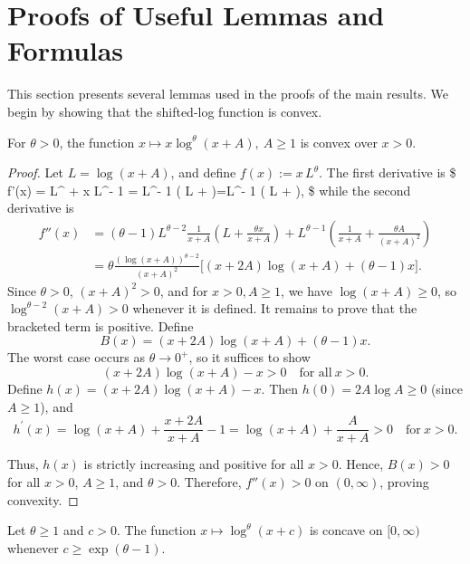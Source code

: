 \documentclass[11pt]{article}
\begin{document}

\section{Proofs of Useful Lemmas and Formulas}\label{app:lemmas}

This section presents several lemmas used in the proofs of the main results. We begin by showing that the shifted-log function is convex.

\begin{lemma}\label{lemma:convex}
For $\theta>0$, the function $x \mapsto x\log^\theta(x + A),~A \geq 1$ is convex over $x>0$.
\end{lemma}

\begin{proof}
Let $L = \log(x + A)$, and define $f(x) := x\, L^{\theta}$.
The first derivative is
\$
f'(x) = L^{\theta} + x \theta L^{\theta - 1} 
= L^{\theta - 1} \left( L +  \right)=L^{\theta - 1} \left( L + \theta{} \right),
\$
while the second derivative is 
\begin{align*}
f''(x)
    &= (\theta - 1)L^{\theta - 2}\frac{1}{x + A}\left( L + \frac{\theta x}{x + A} \right)
+ L^{\theta - 1}\left(\frac{1}{x+A} + \frac{\theta A}{(x + A)^2} \right)\\
    &=\theta\frac{(\log(x+A))^{\theta-2}}{(x+A)^2}\Big[(x+2A)\log(x+A)+(\theta-1)x\Big].
\end{align*}
Since $\theta>0$, $(x+A)^2>0$, and for $x>0, A\ge 1$, we have $\log(x+A)\ge 0$, so $\log^{\theta-2}(x+A)>0$ whenever it is defined. It remains to prove that the bracketed term is positive. Define
$$B(x)=(x+2A)\log(x+A)+(\theta-1)x.$$
The worst case occurs as $\theta\to0^+$, so it suffices to show
$$(x+2A)\log(x+A)-x>0\quad\text{for all}~x>0.$$
Define $h(x)=(x+2A)\log(x+A)-x$. Then $h(0)=2A\log A\ge 0$ (since $A\ge1$), and
$$h^{\prime}(x)=\log(x+A)+\frac{x+2A}{x+A}-1=\log(x+A)+\frac A{x+A}>0\quad\mathrm{for~}x>0.$$

Thus, $h(x)$ is strictly increasing and positive for all $x>0$. Hence, $B(x)>0$ for all $x>0$, $A\ge 1$, and $\theta > 0$. Therefore, $f''(x)>0$ on $(0,\infty)$, proving convexity.
\end{proof}


\begin{lemma}\label{lemma:concave}
Let $\theta \ge 1$ and $c>0$. The function $x \mapsto \log^\theta(x+c)$ is concave on $[0,\infty)$ whenever
$c \ge \exp(\theta-1)$.
\end{lemma}
\end{document}
